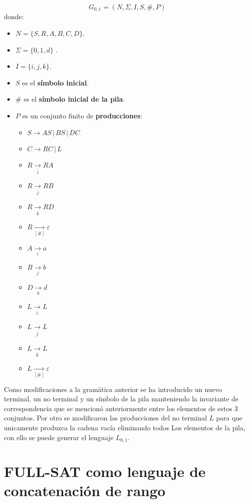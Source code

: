 \documentclass{article}
\begin{document}
$$
    G_{0,1} = (N, \Sigma, I, S, \#, P) 
$$
donde:

\begin{itemize}
    \item $N= \{S,R,A,B,C,D\}$.
    \item \( \Sigma=\{0,1,d\} \) .
    \item $I=\{i,j,k\}$.
    \item $S$ es el \textbf{símbolo inicial}.
    \item $\#$ es el \textbf{símbolo inicial de la pila}.
    \item $P$ es un conjunto finito de \textbf{producciones}:
          \begin{multicols}{2}
              \begin{itemize}
                  \item $S\to AS\,|\,BS\,|\,DC$
                  \item $C\to RC\,|\,L$
                  \item $R\underset{\overline{i}}{\to} RA$
                  \item $R\underset{\overline{j}}{\to} RB$
                  \item $R\underset{\overline{k}}{\to} RD$
                        
                  \item $R\underset{[\#]}{\to} \varepsilon$
                  \item $A\underset{i}{\to} a$
                  \item $B\underset{j}{\to} b$
                  \item $D\underset{k}{\to} d$
                  \item $L\underset{\overline{i}}{\to} L$
                  \item $L\underset{\overline{j}}{\to} L$
                  \item $L\underset{\overline{k}}{\to} L$
                  \item $L\underset{[\#]}{\to} \varepsilon$
              \end{itemize}
          \end{multicols}
\end{itemize}

Como modificaciones a la gramática anterior se ha introducido un nuevo terminal, un no terminal y un símbolo de la pila 
manteniendo la invariante de correspondencia que se mencionó anteriormente entre los elementos de estos 3 conjuntos. Por
otro se modificaron las producciones del no terminal $L$ para que unicamente produzca la cadena vacía eliminando todos Los
elementos de la pila, con ello se puede generar el lenguaje $L_{0,1}$.
\section{FULL-SAT como lenguaje de concatenación de rango}



\end{document}
